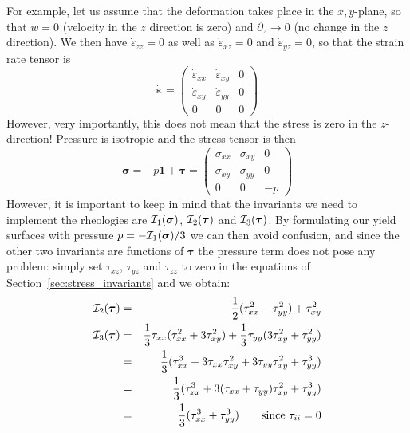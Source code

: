 For example, let us assume that the deformation takes place in the $x,y$-plane,
so that $w=0$ (velocity in the $z$ direction is zero) and $\partial_z \rightarrow 0$ (no change in the $z$ direction).
We then have $\dot{\varepsilon}_{zz}=0$ as well as $\dot{\varepsilon}_{xz}=0$ and $\dot{\varepsilon}_{yz}=0$, so
that the strain rate tensor is 
\[
\dot{\bm \varepsilon}=
\left( \begin{array}{ccc}
\dot{\varepsilon}_{xx} & \dot{\varepsilon}_{xy} & 0 \\
\dot{\varepsilon}_{xy} & \dot{\varepsilon}_{yy} & 0 \\
0 & 0 & 0
\end{array}\right)
\]
However, very importantly, this does not mean that the stress is zero in the $z$-direction! Pressure is 
isotropic and the stress tensor is then 
\[
{\bm \sigma}=
-p {\bm 1} + {\bm \tau} =
\left( \begin{array}{ccc}
{\sigma}_{xx} & {\sigma}_{xy} & 0 \\
{\sigma}_{xy} & {\sigma}_{yy} & 0 \\
0 & 0 & -p
\end{array}\right)
\]
However, it is important to keep in mind that the invariants we need to implement 
the rheologies are ${\cal I}_1({\bm \sigma})$,  ${\cal I}_2({\bm \tau})$ and ${\cal I}_3({\bm \tau})$.
By formulating our yield surfaces with pressure $p=-{\cal I}_1({\bm \sigma})/3$ we can then 
avoid confusion, and since the other two invariants are functions of ${\bm \tau}$ the pressure 
term does not pose any problem: simply set $\tau_{xz}$, $\tau_{yz}$ and $\tau_{zz}$ to zero in the 
equations of Section~\ref{sec:stress_invariants} and we obtain:
\begin{eqnarray}
{\cal I}_2({\bm \tau}) &=&\frac{1}{2}(\tau_{xx}^2 + \tau_{yy}^2 ) + \tau_{xy}^2 \\ 
{\cal I}_3({\bm \tau}) 
&=& \frac{1}{3} \tau_{xx} (  \tau_{xx}^2 + 3 \tau_{xy}^2 ) 
+ \frac{1}{3} \tau_{yy} (3 \tau_{xy}^2 +   \tau_{yy}^2 )   \nonumber\\
&=& \frac{1}{3}(  \tau_{xx}^3 + 3 \tau_{xx}\tau_{xy}^2  
+ 3 \tau_{yy} \tau_{xy}^2 +   \tau_{yy}^3 )   \nonumber\\
&=& \frac{1}{3}(  \tau_{xx}^3 + 3 (\tau_{xx}+\tau_{yy}) \tau_{xy}^2  +  \tau_{yy}^3 )   \nonumber\\
&=& \frac{1}{3}(  \tau_{xx}^3 +  \tau_{yy}^3 )  \qquad \text{since } \tau_{ii}=0 
\end{eqnarray}

